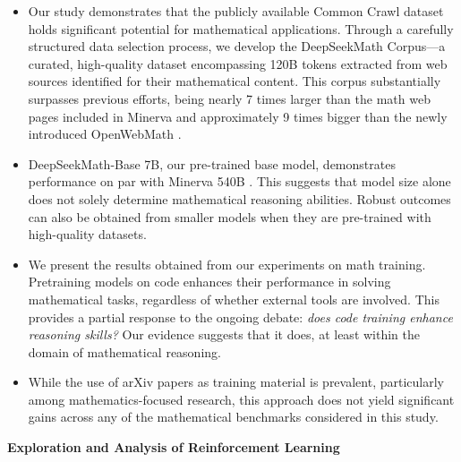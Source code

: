 \begin{itemize}[topsep=0pt]
    \item Our study demonstrates that the publicly available Common Crawl dataset holds significant potential for mathematical applications. Through a carefully structured data selection process, we develop the DeepSeekMath Corpus—a curated, high-quality dataset encompassing 120B tokens extracted from web sources identified for their mathematical content. This corpus substantially surpasses previous efforts, being nearly 7 times larger than the math web pages included in Minerva \citep{minerva} and approximately 9 times bigger than the newly introduced OpenWebMath \citep{openwebmath}.

\item DeepSeekMath-Base 7B, our pre-trained base model, demonstrates performance on par with Minerva 540B \citep{minerva}. This suggests that model size alone does not solely determine mathematical reasoning abilities. Robust outcomes can also be obtained from smaller models when they are pre-trained with high-quality datasets.

\item We present the results obtained from our experiments on math training. Pretraining models on code enhances their performance in solving mathematical tasks, regardless of whether external tools are involved. This provides a partial response to the ongoing debate: \textit{does code training enhance reasoning skills?} Our evidence suggests that it does, at least within the domain of mathematical reasoning.

\item While the use of arXiv papers as training material is prevalent, particularly among mathematics-focused research, this approach does not yield significant gains across any of the mathematical benchmarks considered in this study.
\end{itemize}

\textbf{Exploration and Analysis of Reinforcement Learning}

